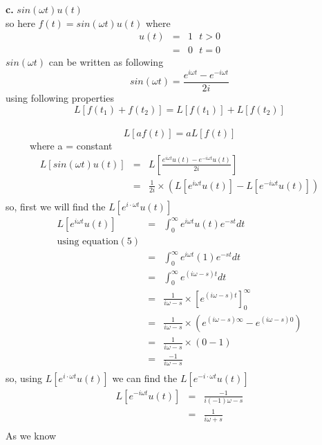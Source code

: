 \documentclass{article}
\begin{document}
\noindent \textbf{c.} $sin(\omega t)u(t)$\\
so here $f(t) = sin(\omega t)u(t)$
where
\begin{eqnarray}
u(t) & = & 1 \ \ \  t>0\\
& = & 0 \ \ \  t=0
\end{eqnarray}
$sin(\omega t)$ can be written as following\\
$$sin(\omega t) = \frac{e^{i\omega t} - e^{-i\omega t}}{2i} $$
using following properties
$$ L[f(t_1) + f(t_2)] = L[f(t_1)] + L[f(t_2)] $$ \\
$$ L[af(t)] = aL[f(t)] $$ \ \ \ \ \ where a = constant \\
\begin{eqnarray}
L[sin(\omega t) u(t)] & = & L[\frac{e^{i\omega t} u(t) - e^{-i\omega t} u(t)}{2i}] \\
& = & \frac{1}{2i}\times(L[e^{i\omega t} u(t)] - L[e^{-i\omega t} u(t)]) \\
\end{eqnarray}
so, first  we will find the $L[e^{i\cdot \omega t}  u(t)]$ \\
\begin{eqnarray*}
L[e^{i\omega t} u(t)]  & = &  \int_0^\infty e^{i\omega t}u(t)e^{-st} dt \\
\mbox{using equation} (5) \\
 &=&  \int_0^\infty e^{i\omega t}(1)e^{-st} dt \\
 &=&  \int_0^\infty e^{(i\omega -s)t}dt \\
 &=&  \frac{1}{i\omega-s}\times [e^{(i\omega -s)t}]_0^\infty \\
 &=&  \frac{1}{i\omega-s}\times(e^{(i \omega -s)\infty} -e^{(i\omega -s)0}) \\
 &=&  \frac{1}{i\omega-s}\times( 0 - 1 ) \\
 &=& \frac{-1}{i\omega-s} \\
\end{eqnarray*}
so, using $L[e^{i\cdot \omega t} u(t)]$  we can find the $L[e^{-i\cdot \omega t} u(t)]$ \\
\begin{eqnarray*}
L[e^{-i\omega t} u(t)]  & = &  \frac{-1}{i(-1)\omega-s} \\
&=&  \frac{1}{i\omega+s} \\
\end{eqnarray*}
As we know
\end{document}
